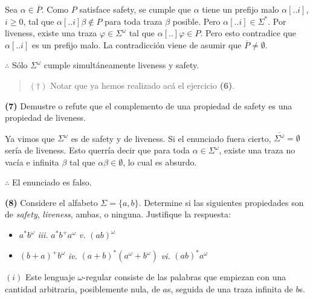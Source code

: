 \documentclass[a4paper, 12pt]{article}
\begin{document}
Sea $\alpha \in \overline{P}$. Como $P$ satisface safety, se cumple que $\alpha$
tiene un prefijo malo $\alpha[..i]$, $i \geq 0$, tal que $\alpha[..i]\beta
\not\in P$ para toda traza $\beta$ posible. Pero $\alpha[..i] \in \Sigma^*$. Por
liveness, existe una traza $\varphi \in \Sigma^\omega$ tal que
$\alpha[..]\varphi \in P$. Pero esto contradice que $\alpha[..i]$ es un prefijo
malo. La contradicción viene de asumir que $\overline{P} \neq \emptyset$.

$\therefore $ Sólo $\Sigma^\omega$ cumple simultáneamente liveness y safety.


\small
\begin{quote}


$(\dagger)$ Notar que ya hemos realizado acá el ejercicio \textbf{(6)}.

\end{quote}
\normalsize


\pagebreak 

\begin{myframe}
    \textbf{(7)} Demustre o refute que el complemento de una propiedad de safety
    es una propiedad de liveness.
\end{myframe}

Ya vimos que $\Sigma^\omega$ es de safety y de liveness. Si el enunciado fuera
cierto,
$\overline{\Sigma^\omega} = \emptyset$ sería de liveness. Esto querría decir que
para toda $\alpha \in \Sigma^\omega$, existe una traza no vacía e infinita
$\beta$ tal que $\alpha\beta \in \emptyset$, lo cual es absurdo.

$\therefore $ El enunciado es falso.

\pagebreak 

\begin{myframe}
    \textbf{(8)} Considere el alfabeto $\Sigma = \{a, b\}$. Determine si las
    siguientes propiedades son de \textit{safety}, \textit{liveness}, ambas, o
    ninguna. Justifique la respuesta:

\begin{itemize}
    \item[\textit{i.}] $a^* b^\omega$ \hfill \textit{iii.} $a^* b^+ a^\omega$ \hfill \textit{v.} $(ab)^\omega$
    \item[\textit{ii.}] $(b + a)^+ b^\omega$ \hfill \textit{iv.} $(a + b)^* (a^\omega + b^\omega)$ \hfill \textit{vi.} $(ab)^* a^\omega$
\end{itemize}
\end{myframe}

$(i)$ Este lenguaje $\omega$-regular consiste de las palabras que empiezan con
una cantidad arbitraria, posiblemente nula, de $a$s, seguida de una traza
infinita de $b$s. 
\end{document}
